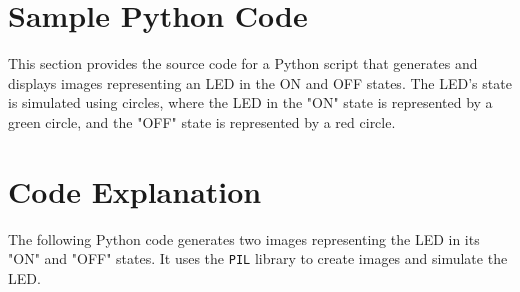 \section{Sample Python Code}

This section provides the source code for a Python script that generates and displays images representing an LED in the ON and OFF states. The LED's state is simulated using circles, where the LED in the "ON" state is represented by a green circle, and the "OFF" state is represented by a red circle.


\section{Code Explanation}

The following Python code generates two images representing the LED in its "ON" and "OFF" states. It uses the \texttt{PIL} library to create images and simulate the LED.

